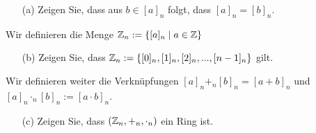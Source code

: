 \documentclass[
				a4paper,
				10pt
			]
			{scrartcl}
\begin{document}
\begin{itemize}
\item[(a)] Zeigen Sie, dass aus $b \in [a]_n$ folgt, dass $[a]_n=[b]_n$.
\end{itemize}
Wir definieren die Menge
$
\mathbb{Z}_n := \{[a]_n \mid a \in \mathbb{Z}\}
$
\begin{itemize}
\item[(b)] Zeigen Sie, dass $\mathbb{Z}_n:=\{[0]_n,[1]_n,[2]_n,...,[n-1]_n\}$ gilt.
\end{itemize}
Wir definieren weiter die Verkn\"upfungen $[a]_n+_n[b]_n=[a+b]_n$ und $[a]_n\cdot_n [b]_n:=[a\cdot b]_n$.
\begin{itemize}
\item[(c)] Zeigen Sie, dass $(\mathbb{Z}_n,+_n,\cdot_n)$ ein Ring ist.
\end{itemize}

\end{document}
